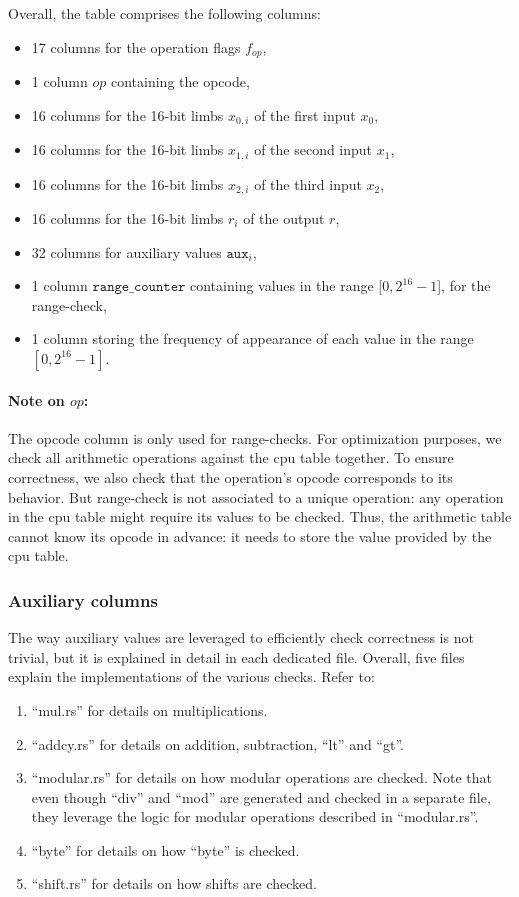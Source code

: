 Overall, the table comprises the following columns:
\begin{itemize}
    \item 17 columns for the operation flags $f_{op}$,
    \item 1 column $op$ containing the opcode,
    \item 16 columns for the 16-bit limbs $x_{0, i}$ of the first input $x_{0}$,
    \item 16 columns for the 16-bit limbs $x_{1, i}$ of the second input $x_{1}$,
    \item 16 columns for the 16-bit limbs $x_{2, i}$ of the third input $x_{2}$,
    \item 16 columns for the 16-bit limbs $r_i$ of the output $r$,
    \item 32 columns for auxiliary values $\texttt{aux}_i$,
    \item 1 column $\texttt{range\_counter}$ containing values in the range [$0, 2^{16}-1$], for the range-check,
    \item 1 column storing the frequency of appearance of each value in the range $[0, 2^{16} - 1]$.
\end{itemize}

\paragraph{Note on $op$:} The opcode column is only used for range-checks. For optimization purposes, we check all arithmetic operations against the cpu table together. To ensure correctness, we also check that the operation's opcode corresponds to its behavior. But range-check is not associated to a unique operation: any operation in the cpu table might require its values to be checked. Thus, the arithmetic table cannot know its opcode in advance: it needs to store the value provided by the cpu table.

\subsubsection{Auxiliary columns}
The way auxiliary values are leveraged to efficiently check correctness is not trivial, but it is explained in detail in each dedicated file. Overall, five files explain the implementations of the various checks. Refer to:
\begin{enumerate}
    \item ``mul.rs'' for details on multiplications.
    \item ``addcy.rs'' for details on addition, subtraction, ``lt'' and ``gt''. 
    \item ``modular.rs'' for details on how modular operations are checked. Note that even though ``div'' and ``mod'' are generated and checked in a separate file, they leverage the logic for modular operations described in ``modular.rs''. 
    \item ``byte'' for details on how ``byte'' is checked.
    \item ``shift.rs'' for details on how shifts are checked. 
\end{enumerate}

